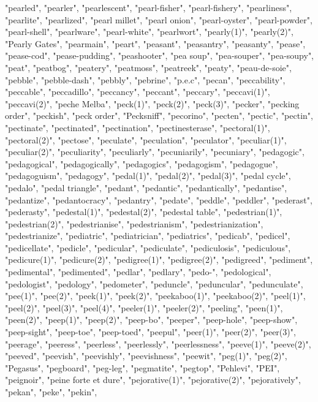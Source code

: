 "pearled",
"pearler",
"pearlescent",
"pearl-fisher",
"pearl-fishery",
"pearliness",
"pearlite",
"pearlized",
"pearl millet",
"pearl onion",
"pearl-oyster",
"pearl-powder",
"pearl-shell",
"pearlware",
"pearl-white",
"pearlwort",
"pearly(1)",
"pearly(2)",
"Pearly Gates",
"pearmain",
"peart",
"peasant",
"peasantry",
"peasanty",
"pease",
"pease-cod",
"pease-pudding",
"peashooter",
"pea soup",
"pea-souper",
"pea-soupy",
"peat",
"peatbog",
"peatery",
"peatmoss",
"peatreek",
"peaty",
"peau-de-soie",
"pebble",
"pebble-dash",
"pebbly",
"pebrine",
"p.e.c",
"pecan",
"peccability",
"peccable",
"peccadillo",
"peccancy",
"peccant",
"peccary",
"peccavi(1)",
"peccavi(2)",
"peche Melba",
"peck(1)",
"peck(2)",
"peck(3)",
"pecker",
"pecking order",
"peckish",
"peck order",
"Pecksniff",
"pecorino",
"pecten",
"pectic",
"pectin",
"pectinate",
"pectinated",
"pectination",
"pectinesterase",
"pectoral(1)",
"pectoral(2)",
"pectose",
"peculate",
"peculation",
"peculator",
"peculiar(1)",
"peculiar(2)",
"peculiarity",
"peculiarly",
"pecuniarily",
"pecuniary",
"pedagogic",
"pedagogical",
"pedagogically",
"pedagogics",
"pedagogism",
"pedagogue",
"pedagoguism",
"pedagogy",
"pedal(1)",
"pedal(2)",
"pedal(3)",
"pedal cycle",
"pedalo",
"pedal triangle",
"pedant",
"pedantic",
"pedantically",
"pedantise",
"pedantize",
"pedantocracy",
"pedantry",
"pedate",
"peddle",
"peddler",
"pederast",
"pederasty",
"pedestal(1)",
"pedestal(2)",
"pedestal table",
"pedestrian(1)",
"pedestrian(2)",
"pedestrianise",
"pedestrianism",
"pedestrianization",
"pedestrianize",
"pediatric",
"pediatrician",
"pediatrics",
"pedicab",
"pedicel",
"pedicellate",
"pedicle",
"pedicular",
"pediculate",
"pediculosis",
"pediculous",
"pedicure(1)",
"pedicure(2)",
"pedigree(1)",
"pedigree(2)",
"pedigreed",
"pediment",
"pedimental",
"pedimented",
"pedlar",
"pedlary",
"pedo-",
"pedological",
"pedologist",
"pedology",
"pedometer",
"peduncle",
"peduncular",
"pedunculate",
"pee(1)",
"pee(2)",
"peek(1)",
"peek(2)",
"peekaboo(1)",
"peekaboo(2)",
"peel(1)",
"peel(2)",
"peel(3)",
"peel(4)",
"peeler(1)",
"peeler(2)",
"peeling",
"peen(1)",
"peen(2)",
"peep(1)",
"peep(2)",
"peep-bo",
"peeper",
"peep-hole",
"peep-show",
"peep-sight",
"peep-toe",
"peep-toed",
"peepul",
"peer(1)",
"peer(2)",
"peer(3)",
"peerage",
"peeress",
"peerless",
"peerlessly",
"peerlessness",
"peeve(1)",
"peeve(2)",
"peeved",
"peevish",
"peevishly",
"peevishness",
"peewit",
"peg(1)",
"peg(2)",
"Pegasus",
"pegboard",
"peg-leg",
"pegmatite",
"pegtop",
"Pehlevi",
"PEI",
"peignoir",
"peine forte et dure",
"pejorative(1)",
"pejorative(2)",
"pejoratively",
"pekan",
"peke",
"pekin",
